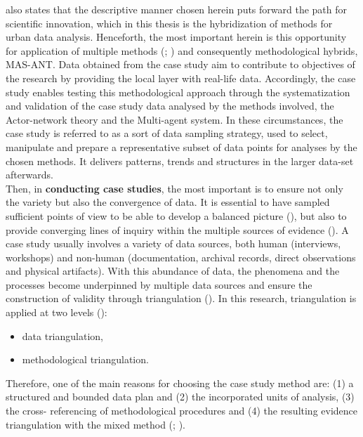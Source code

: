 \documentclass[11pt]{report}
\begin{document}
{{{{\href{Flvybjerg}{\cite{flyvbjerg_five_2006}} also states that the descriptive manner chosen herein puts forward the path for scientific innovation, which in this thesis is the hybridization of methods for urban data analysis. Henceforth, the most important herein is this opportunity for application of multiple methods (\href{Yin}{\citealt{yin_case_2003}}; \href{Yin} {\citealt{yin_case_2009}}) and consequently methodological hybrids, MAS-ANT.
Data obtained from the case study aim to contribute to objectives of the research by providing the local layer with real-life data. Accordingly, the case study enables testing this methodological approach through the systematization and validation of the case study data analysed by the methods involved, the Actor-network theory and the Multi-agent system. In these circumstances, the case study is referred to as a sort of data sampling strategy, used to select, manipulate and prepare a representative subset of data points for analyses by the chosen methods. It delivers patterns, trends and structures in the larger data-set afterwards.
\\

Then, in \textbf{conducting case studies}, the most important is to ensure not only the variety but also the convergence of data. It is essential to have sampled  sufficient  points  of  view  to be able to develop a balanced picture (\href{Harrison}{\citealt{partington_case_2002}}), but also to provide converging lines of inquiry within the multiple sources of evidence (\href{Yin} {\citealt{yin_case_2009}}).
A case study usually involves a variety of data sources, both human (interviews, workshops) and non-human (documentation, archival records, direct observations and physical artifacts).
With this abundance of data, the phenomena and the processes become underpinned by multiple data sources and ensure the construction of validity through triangulation (\href{Denzin}{\citealt{denzin_research_2009}}). In this research, triangulation is applied at two levels (\href{Patton}{\citealt{patton_qualitative_2001}}):

\begin{itemize}
\item data triangulation,
\item methodological triangulation. 
\end{itemize}

Therefore, one of the main reasons for choosing the case study method are: (1) a structured and bounded data plan and (2) the incorporated units of analysis, (3) the cross- referencing of methodological procedures and (4) the resulting evidence triangulation with the mixed method (\href{Patton}{\citealt{patton_how_1987}}; \href{Yin} {\citealt{yin_case_2009}}).
\\

}}}}
\end{document}
